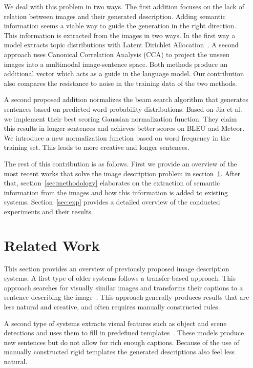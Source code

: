 \documentclass[twoside,twocolumn]{article}
\begin{document}
	We deal with this problem in two ways. The first addition focuses on the lack of relation between images and their generated description. Adding semantic information seems a viable way to guide the generation in the right direction. This information is extracted from the images in two ways. In the first way a model extracts topic distributions with Latent Dirichlet Allocation~\cite{Blei2012}. A second approach uses Canonical Correlation Analysis (CCA) to project the unseen images into a multimodal image-sentence space. Both methods produce an additional vector which acts as a guide in the language model. Our contribution also compares the resistance to noise in the training data of the two methods.
	
	A second proposed addition normalizes the beam search algorithm that generates sentences based on predicted word probability distributions. Based on Jia et al.~\cite{Fernando2015} we implement their best scoring Gaussian normalization function. They claim this results in longer sentences and achieves better scores on BLEU and Meteor. We introduce a new normalization function based on word frequency in the training set. This leads to more creative and longer sentences. 
	
	The rest of this contribution is as follows. First we provide an overview of the most recent works that solve the image description problem in section~\ref{sec:related}. After that, section~\ref{sec:methodology} elaborates on the extraction of semantic information from the images and how this information is added to existing systems. Section~\ref{sec:exp} provides a detailed overview of the conducted experiments and their results. 
	
	\section{Related Work}
	\label{sec:related}
	This section provides an overview of previously proposed image description systems.
	A first type of older systems follows a transfer-based approach. This approach searches for visually similar images and transforms their captions to a sentence describing the image~\cite{Devlin2015a,Hodosh2013,Kuznetsova2012,Ordonez2011}.
	This approach generally produces results that are less natural and creative, and often requires manually constructed rules.
	
	A second type of systems extracts visual features such as object and scene detections and uses them to fill in predefined templates~\cite{Farhadi2010,Mitchell2012,Yang2011}. These models produce new sentences but do not allow for rich enough captions.
	Because of the use of manually constructed rigid templates the generated descriptions also feel less natural. 
	
\end{document}
